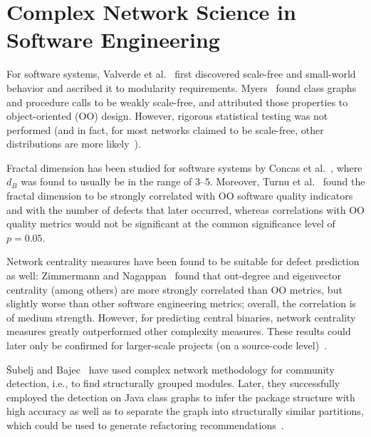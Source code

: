 \section{Complex Network Science in Software Engineering}\label{sec:related_software}

For software systems,
Valverde et al.~\cite{ScaleFreeSoftware2002Valverde} first discovered scale-free and small-world behavior and ascribed it to modularity requirements.
Myers~\cite{Networks2003Myers} found class graphs and procedure calls to be weakly scale-free,
and attributed those properties to object-oriented (OO) design.
However, rigorous statistical testing was not performed
(and in fact, for most networks claimed to be scale-free, other distributions are more likely~\cite{ScalefreeRare2019Broido}).

Fractal dimension has been studied for software systems by Concas et al.~\cite{FracDimSoftware2006Concas},
where $d_B$ was found to usually be in the range of \numrange{3}{5}.
Moreover, Turnu et al.~\cite{FractalDimension2013Turnu} found the fractal dimension to be strongly correlated with OO software quality indicators
and with the number of defects that later occurred,
whereas correlations with OO quality metrics would not be significant at the common significance level of $p = 0.05$.

Network centrality measures  have been found to be suitable for defect prediction as well:
Zimmermann and Nagappan~\cite{DefectsMetrics2008Zimmermann} found that out-degree and eigenvector centrality (among others) are more strongly correlated than OO metrics,
but slightly worse than other software engineering metrics;
overall, the correlation is of medium strength.
However, for predicting central binaries,
network centrality measures greatly outperformed other complexity measures.
These results could later only be confirmed for larger-scale projects (on a source-code level)~\cite{NetworkDefects2009Tosun}.

\v{S}ubelj and Bajec~\cite{CommunityDetect2011Subelj} have used complex network methodology for community detection,
i.e., to find structurally grouped modules.
Later, they successfully employed the detection on Java class graphs to infer the package structure with high accuracy
as well as to separate the graph into structurally similar partitions,
which could be used to generate refactoring recommendations~\cite{Networks2012Subelj,Clustering2012Subelj}.